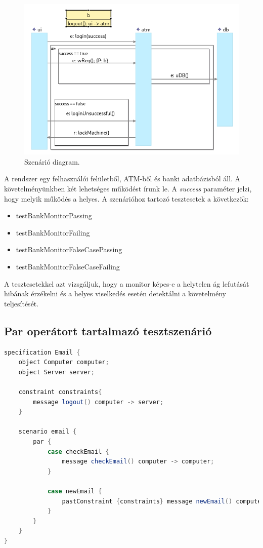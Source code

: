 \begin{figure}[!ht]
    \centering
    \includegraphics[width=150mm, keepaspectratio]{figures/diagramAltExample.png}
    \caption{Szenárió diagram.}
\end{figure}

A rendszer egy felhasználói felületből, ATM-ből és banki adatbázisból áll.
A követelményünkben két lehetséges működést írunk le.
A \textit{success} paraméter jelzi, hogy melyik működés a helyes.
A szenárióhoz tartozó tesztesetek a következők:

\begin{itemize}
    \item testBankMonitorPassing
    \item testBankMonitorFailing
    \item testBankMonitorFalseCasePassing
    \item testBankMonitorFalseCaseFailing
\end{itemize}

A tesztesetekkel azt vizsgáljuk, hogy a monitor képes-e a helytelen ág lefutását hibának érzékelni és a helyes viselkedés esetén detektálni a követelmény teljesítését.

\clearpage\subsection{Par operátort tartalmazó tesztszenárió}

\begin{lstlisting}[language=java, frame=single, float=ht!, caption={Integrációs teszteset.},captionpos=b]
specification Email {
    object Computer computer;
    object Server server;

    constraint constraints{
        message logout() computer -> server;
    }

    scenario email {
        par {
            case checkEmail {
                message checkEmail() computer -> computer;
            }

            case newEmail {
                pastConstraint {constraints} message newEmail() computer -> server;
            }
        }
    }
}
\end{lstlisting}

